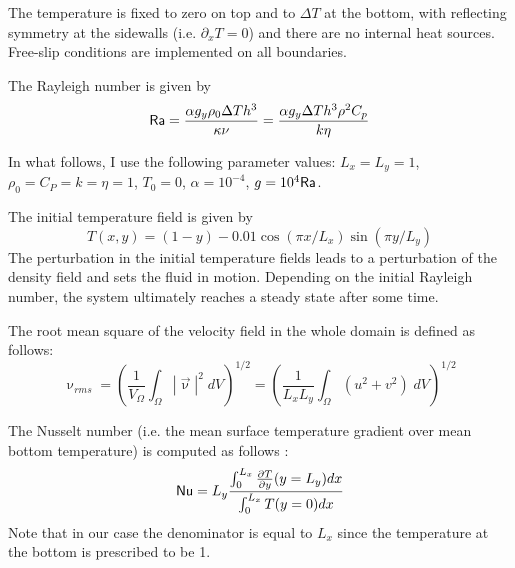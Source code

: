 The temperature is fixed to zero on top and to $\Delta T$ at the bottom, 
with reflecting symmetry at the sidewalls (i.e. $\partial_x T=0$) 
and there are no internal heat sources. 
Free-slip conditions are implemented on all boundaries. 

The Rayleigh number is given by
\begin{equation}
{\mathsf{Ra}} = \frac{\alpha g_y \rho_0 \Delta T h^3 }{\kappa \nu}
=\frac{\alpha g_y \Delta T h^3 \rho^2 C_p}{k \eta}
\end{equation}

In what follows, I use the following parameter values:  
$L_x=L_y=1$, $\rho_0=C_P=k=\eta=1$, $T_0=0$, $\alpha=10^{-4}$, $g=10^{4}{\mathsf{Ra}}$.

The initial temperature field is given by 
\begin{equation}
T(x,y)=(1-y) - 0.01\cos(\pi x/L_x) \sin(\pi y/L_y)
\end{equation}
The perturbation in the initial temperature fields leads to 
a perturbation of the density field and sets the fluid in motion. 
Depending on the initial Rayleigh number, the system ultimately reaches a 
steady state after some time. 

The root mean square of the velocity field in the whole domain is defined as 
follows:
\begin{equation}
\upnu_{rms}
= \left( \frac{1}{V_\Omega} \int_\Omega |{\vec \upnu}|^2 \; dV \right)^{1/2} 
= \left( \frac{1}{L_xL_y} \int_\Omega (u^2+v^2) \; dV \right)^{1/2} 
\label{eq_vrms}
\end{equation}


The Nusselt number (i.e. the mean surface temperature gradient over mean bottom temperature)
is computed as follows \cite{blbc89}:
\begin{equation}
{\mathsf{Nu}} = L_y \frac{\int_0^{L_x} \frac{\partial T}{\partial y}(y=L_y) dx  }{\int_0^{L_x} T(y=0) dx}
\label{eqNu}
\end{equation}
Note that in our case the denominator is equal to $L_x$ since the temperature at the 
bottom is prescribed to be 1.

